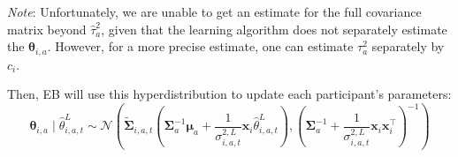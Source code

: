 \textit{Note}: Unfortunately, we are unable to get an estimate for the full covariance matrix beyond $\hat{\tau}^2_a$, given that the learning algorithm does not separately estimate the $\boldsymbol{\theta}_{i,a}$. However, for a more precise estimate, one can estimate $\tau^2_a$ separately by $c_i$.

Then, EB will use this hyperdistribution to update each participant's parameters:
$$\boldsymbol{\theta}_{i,a}
\mid
\hat{\theta}^{L}_{i,a,t}
\sim
\mathcal{N}
\left(\tilde{\boldsymbol{\Sigma}}_{i,a,t}
\left(
\boldsymbol{\Sigma}_a^{-1}\boldsymbol{\mu}_a
+
\frac{1}{\sigma^{2,L}_{i,a,t}}
\boldsymbol{x}_i
\hat{\theta}^{L}_{i,a,t}
\right),
\left(
\boldsymbol{\Sigma}_a^{-1}
+
\frac{1}{\sigma^{2,L}_{i,a,t}}
\boldsymbol{x}_i
\boldsymbol{x}_i^{\top}
\right)^{-1}
\right)$$